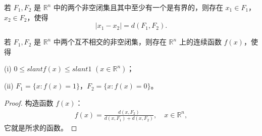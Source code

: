 \documentclass[../../main.tex]{subfiles}
\begin{document}
\begin{corollary}
若 \(F_1,F_2\) 是 \(\mathbb{R}^n\) 中的两个非空闭集且其中至少有一个是有界的，则存在 \(x_1\in F_1\)，\(x_2\in F_2\)，使得
\[
|x_1 - x_2| = d(F_1,F_2).
\] 
\end{corollary}

\begin{lemma}
若 \(F_1,F_2\) 是 \(\mathbb{R}^n\) 中两个互不相交的非空闭集，则存在 \(\mathbb{R}^n\) 上的连续函数 \(f(x)\)，使得

(i) \(0\leqslant slant f(x)\leqslant slant 1\) \((x\in\mathbb{R}^n)\)；

(ii) \(F_1 = \{x: f(x) = 1\}\)，\(F_2 = \{x: f(x) = 0\}\)。
\end{lemma}
\begin{proof}
构造函数 \(f(x)\)：
\begin{align*}
f(x)=\frac{d(x,F_2)}{d(x,F_1)+d(x,F_2)}, \quad x\in\mathbb{R}^n,
\end{align*}
它就是所求的函数。 
\end{proof}
\end{document}
